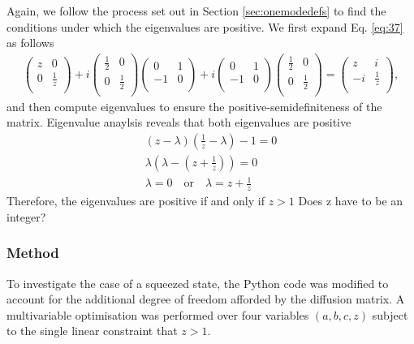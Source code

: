\documentclass[11pt,a4paper]{article}
\numberwithin{equation}{section}
\begin{document}
	Again, we follow the process set out in Section \ref{sec:onemodedefs} to find the conditions under which  the eigenvalues are positive. We first expand Eq. \ref{eq:37} as follows
	\begin{align*}
	\begin{pmatrix}
	z & 0  \\
	0 & \frac{1}{z}\\
	\end{pmatrix} + i\begin{pmatrix}
	\frac{1}{2} & 0  \\
	0 & \frac{1}{2} \\
	\end{pmatrix}\begin{pmatrix}
	0 & 1  \\
	-1 & 0 \\
	\end{pmatrix} + i\begin{pmatrix}
	0 & 1  \\
	-1 & 0 \\
	\end{pmatrix}\begin{pmatrix}
	\frac{1}{2} & 0  \\
	0 & \frac{1}{2} \\
	\end{pmatrix}=
	\begin{pmatrix}
	z & i  \\
	-i & \frac{1}{z} \\
	\end{pmatrix},
	\end{align*}
	and then compute eigenvalues to ensure the positive-semidefiniteness of the matrix. Eigenvalue anaylsis reveals that both eigenvalues are positive
	\begin{align*}
	&(z- \lambda)(\frac{1}{z} - \lambda) - 1 = 0&\\
	&\lambda(\lambda - (z+ \frac{1}{z})) = 0&\\
	&\lambda = 0\quad\text{or}\quad\lambda= z+ \frac{1}{z}&
	\end{align*}
	Therefore, the eigenvalues are positive if and only if $z > 1$ \color{red}Does z have to be an integer?
	 		
	\subsubsection{Method}\color{black}
	
	To investigate the case of a squeezed state, the Python code was modified to account for the additional degree of freedom afforded by the diffusion matrix. A multivariable optimisation was performed over four variables $(a, b, c, z)$ subject to the single linear constraint that $z>1$.
	
\end{document}
